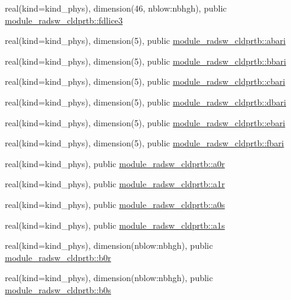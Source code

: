 \begin{DoxyCompactItemize}
\item 
real(kind=kind\+\_\+phys), dimension(46, nblow\+:nbhgh), public \hyperlink{namespacemodule__radsw__cldprtb_aa42cf6596d2dcd887864b1de40da3293}{module\+\_\+radsw\+\_\+cldprtb\+::fdlice3}
\item 
real(kind=kind\+\_\+phys), dimension(5), public \hyperlink{namespacemodule__radsw__cldprtb_ace960bbbf15ab3cadbee76301ff111dd}{module\+\_\+radsw\+\_\+cldprtb\+::abari}
\item 
real(kind=kind\+\_\+phys), dimension(5), public \hyperlink{namespacemodule__radsw__cldprtb_ad5342321ccd4759cb70f7a673620ee19}{module\+\_\+radsw\+\_\+cldprtb\+::bbari}
\item 
real(kind=kind\+\_\+phys), dimension(5), public \hyperlink{namespacemodule__radsw__cldprtb_ae7f1de5c9736894ac7b54c0e0d312f16}{module\+\_\+radsw\+\_\+cldprtb\+::cbari}
\item 
real(kind=kind\+\_\+phys), dimension(5), public \hyperlink{namespacemodule__radsw__cldprtb_af8b02590603ea2f838d954cb0a93bbeb}{module\+\_\+radsw\+\_\+cldprtb\+::dbari}
\item 
real(kind=kind\+\_\+phys), dimension(5), public \hyperlink{namespacemodule__radsw__cldprtb_a3cc7ab844ca564bd3df02a687bbc2f43}{module\+\_\+radsw\+\_\+cldprtb\+::ebari}
\item 
real(kind=kind\+\_\+phys), dimension(5), public \hyperlink{namespacemodule__radsw__cldprtb_ac2e5b61aea6effe7d49586bf5223c154}{module\+\_\+radsw\+\_\+cldprtb\+::fbari}
\item 
real(kind=kind\+\_\+phys), public \hyperlink{namespacemodule__radsw__cldprtb_a0fdb9425031a10735e11d7f5c9e0376e}{module\+\_\+radsw\+\_\+cldprtb\+::a0r}
\item 
real(kind=kind\+\_\+phys), public \hyperlink{namespacemodule__radsw__cldprtb_a9826a0616c434620200ce4652b5af800}{module\+\_\+radsw\+\_\+cldprtb\+::a1r}
\item 
real(kind=kind\+\_\+phys), public \hyperlink{namespacemodule__radsw__cldprtb_a81ba576e28e5844772d040ff7543faae}{module\+\_\+radsw\+\_\+cldprtb\+::a0s}
\item 
real(kind=kind\+\_\+phys), public \hyperlink{namespacemodule__radsw__cldprtb_a9bf8de06b96c5014ca7f21fd39d84257}{module\+\_\+radsw\+\_\+cldprtb\+::a1s}
\item 
real(kind=kind\+\_\+phys), dimension(nblow\+:nbhgh), public \hyperlink{namespacemodule__radsw__cldprtb_ac39d49e73ffa960421e36e45a35db162}{module\+\_\+radsw\+\_\+cldprtb\+::b0r}
\item 
real(kind=kind\+\_\+phys), dimension(nblow\+:nbhgh), public \hyperlink{namespacemodule__radsw__cldprtb_a391fbdda62f6fba95e105c2041e16880}{module\+\_\+radsw\+\_\+cldprtb\+::b0s}

\end{DoxyCompactItemize}
